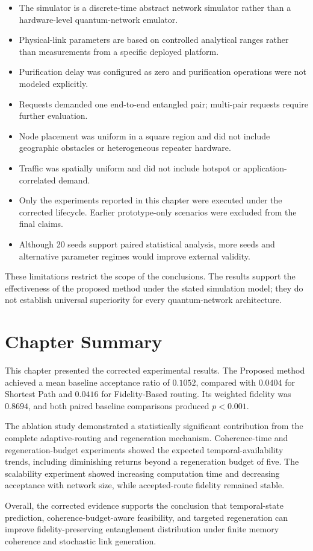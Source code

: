 \begin{itemize}
    \item The simulator is a discrete-time abstract network simulator rather
    than a hardware-level quantum-network emulator.
    \item Physical-link parameters are based on controlled analytical ranges
    rather than measurements from a specific deployed platform.
    \item Purification delay was configured as zero and purification operations
    were not modeled explicitly.
    \item Requests demanded one end-to-end entangled pair; multi-pair requests
    require further evaluation.
    \item Node placement was uniform in a square region and did not include
    geographic obstacles or heterogeneous repeater hardware.
    \item Traffic was spatially uniform and did not include hotspot or
    application-correlated demand.
    \item Only the experiments reported in this chapter were executed under the
    corrected lifecycle. Earlier prototype-only scenarios were excluded from
    the final claims.
    \item Although 20 seeds support paired statistical analysis, more seeds and
    alternative parameter regimes would improve external validity.
\end{itemize}

These limitations restrict the scope of the conclusions. The results support
the effectiveness of the proposed method under the stated simulation model;
they do not establish universal superiority for every quantum-network
architecture.

\section{Chapter Summary}

This chapter presented the corrected experimental results. The Proposed method
achieved a mean baseline acceptance ratio of \(0.1052\), compared with
\(0.0404\) for Shortest Path and \(0.0416\) for Fidelity-Based routing. Its
weighted fidelity was \(0.8694\), and both paired baseline comparisons produced
\(p<0.001\).

The ablation study demonstrated a statistically significant contribution from
the complete adaptive-routing and regeneration mechanism. Coherence-time and
regeneration-budget experiments showed the expected temporal-availability
trends, including diminishing returns beyond a regeneration budget of five.
The scalability experiment showed increasing computation time and decreasing
acceptance with network size, while accepted-route fidelity remained stable.

Overall, the corrected evidence supports the conclusion that temporal-state
prediction, coherence-budget-aware feasibility, and targeted regeneration can
improve fidelity-preserving entanglement distribution under finite memory
coherence and stochastic link generation.